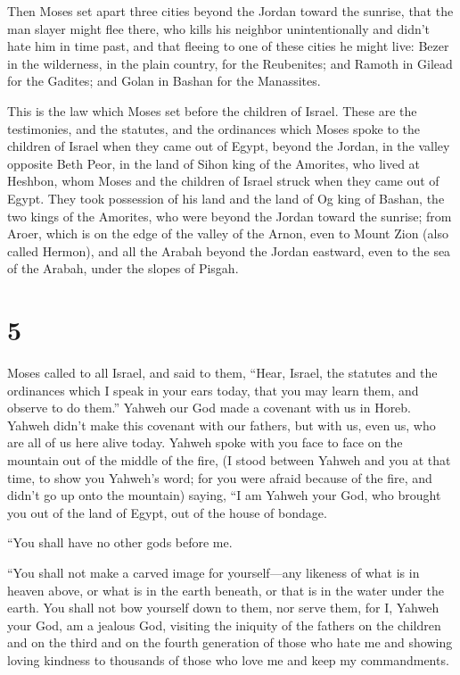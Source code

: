  Then Moses set apart three cities beyond the Jordan
toward the sunrise,  that the man slayer might flee
there, who kills his neighbor unintentionally and didn't hate him in
time past, and that fleeing to one of these cities he might live:
 Bezer in the wilderness, in the plain country, for the
Reubenites; and Ramoth in Gilead for the Gadites; and Golan in Bashan
for the Manassites.

 This is the law which Moses set before the children of
Israel.  These are the testimonies, and the statutes, and
the ordinances which Moses spoke to the children of Israel when they
came out of Egypt,  beyond the Jordan, in the valley
opposite Beth Peor, in the land of Sihon king of the Amorites, who lived
at Heshbon, whom Moses and the children of Israel struck when they came
out of Egypt.  They took possession of his land and the
land of Og king of Bashan, the two kings of the Amorites, who were
beyond the Jordan toward the sunrise;  from Aroer, which
is on the edge of the valley of the Arnon, even to Mount Zion (also
called Hermon),  and all the Arabah beyond the Jordan
eastward, even to the sea of the Arabah, under the slopes of Pisgah.

\hypertarget{section-4}{%
\section{5}\label{section-4}}

 Moses called to all Israel, and said to them, ``Hear,
Israel, the statutes and the ordinances which I speak in your ears
today, that you may learn them, and observe to do them.'' 
Yahweh our God made a covenant with us in Horeb.  Yahweh
didn't make this covenant with our fathers, but with us, even us, who
are all of us here alive today.  Yahweh spoke with you
face to face on the mountain out of the middle of the fire,
 (I stood between Yahweh and you at that time, to show you
Yahweh's word; for you were afraid because of the fire, and didn't go up
onto the mountain) saying,  ``I am Yahweh your God, who
brought you out of the land of Egypt, out of the house of bondage.

 ``You shall have no other gods before me.

 ``You shall not make a carved image for yourself---any
likeness of what is in heaven above, or what is in the earth beneath, or
that is in the water under the earth.  You shall not bow
yourself down to them, nor serve them, for I, Yahweh your God, am a
jealous God, visiting the iniquity of the fathers on the children and on
the third and on the fourth generation of those who hate me
 and showing loving kindness to thousands of those who
love me and keep my commandments.

